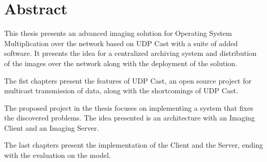\begingroup
\let\clearpage\relax
\let\cleardoublepage\relax
\let\cleardoublepage\relax

\chapter*{Abstract}
This thesis presents an advanced imaging solution for Operating System
Multiplication over the network based on UDP Cast with a suite of added
software. It presents the idea for a centralized archiving system and
distribution of the images over the network along with the deployment
of the solution.

The fist chapters present the features of UDP Cast, an open source project
for multicast transmission of data, along with the shortcomings of
UDP Cast.

The proposed project in the thesis focuses on implementing a system that
fixes the discovered problems. The idea presented is an architecture with
an Imaging Client and an Imaging Server.

The last chapters present the implementation of the Client and the Server,
ending with the evaluation on the model.



\endgroup

\vfill
